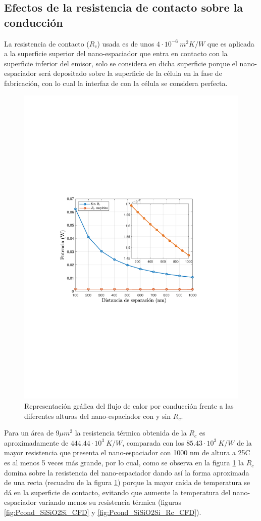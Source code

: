 \subsection{Efectos de la resistencia de contacto sobre la conducción}
La resistencia de contacto ($R_c$) usada es de unos $4\cdot 10^{-6} \ m^2 K/W$ \cite{nf_TPV_Pillars_SiO2} que es aplicada a la superficie superior del nano-espaciador que entra en contacto con la superficie inferior del emisor, solo se considera en dicha superficie porque el nano-espaciador será depositado sobre la superficie de la célula en la fase de fabricación, con lo cual la interfaz de con la célula se considera perfecta.
\begin{figure}[H]
	\centering
		\includegraphics[width=.55\textwidth]{figuras/Resultados/conduccion/pdf/PrcComb2PDF_SiSiO2Si}
	\caption[Efectos de la resistencia de contacto sobre el flujo de calor por conducción]{Representación gráfica del flujo de calor por conducción frente a las diferentes alturas del nano-espaciador con y sin $R_c$. 
	}
	\label{fig:PcondRc_SiSiO2Si}
\end{figure}
Para un área de 9$\mu m^2$ la resistencia térmica obtenida de la $R_c$ es aproximadamente de $444.44\cdot 10^3 \ K/W$, comparada con los $85.43\cdot 10^3 \ K/W$ de la mayor resistencia que presenta el nano-espaciador con 1000 nm de altura a 25\textdegree C es al menos 5 veces más grande, por lo cual, como se observa en la figura \ref{fig:PcondRc_SiSiO2Si} la $R_c$ domina sobre la resistencia del nano-espaciador dando así la forma aproximada de una recta (recuadro de la figura \ref{fig:PcondRc_SiSiO2Si}) porque la mayor caída de temperatura se dá en la superficie de contacto, evitando que aumente la temperatura del nano-espaciador variando menos su resistencia térmica (figuras \ref{fig:Pcond_SiSiO2Si_CFD} y \ref{fig:Pcond_SiSiO2Si_Rc_CFD}).
